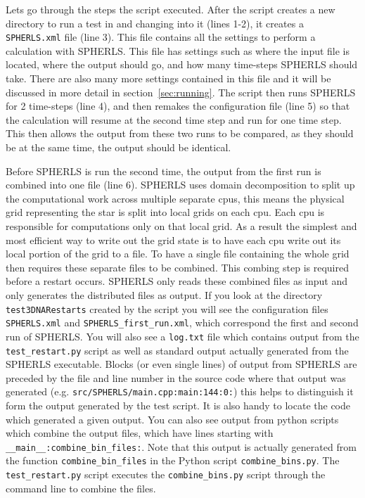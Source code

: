 \documentclass[12pt,a4paper]{book}
\begin{document}
Lets go through the steps the script executed. After the script creates a new directory to run a test in and changing into it (lines 1-2), it creates a {\tt SPHERLS.xml} file (line 3). This file contains all the settings to perform a calculation with SPHERLS. This file has settings such as where the input file is located, where the output should go, and how many time-steps SPHERLS should take. There are also many more settings contained in this file and it will be discussed in more detail in section~\ref{sec:running}. The script then runs SPHERLS for 2 time-steps (line 4), and then remakes the configuration file (line 5) so that the calculation will resume at the second time step and run for one time step. This then allows the output from these two runs to be compared, as they should be at the same time, the output should be identical. 

Before SPHERLS is run the second time, the output from the first run is combined into one file (line 6). SPHERLS uses domain decomposition to split up the computational work across multiple separate cpus, this means the physical grid representing the star is split into local grids on each cpu. Each cpu is responsible for computations only on that local grid. As a result the simplest and most efficient way to write out the grid state is to have each cpu write out its local portion of the grid to a file. To have a single file containing the whole grid then requires these separate files to be combined. This combing step is required before a restart occurs. SPHERLS only reads these combined files as input and only generates the distributed files as output. If you look at the directory {\tt test3DNARestarts} created by the script you will see the configuration files {\tt SPHERLS.xml} and {\tt SPHERLS\_first\_run.xml}, which correspond the first and second run of SPHERLS. You will also see a {\tt log.txt} file which contains output from the {\tt test\_restart.py} script as well as standard output actually generated from the SPHERLS executable. Blocks (or even single lines) of output from SPHERLS are preceded by the file and line number in the source code where that output was generated (e.g. {\tt src/SPHERLS/main.cpp:main:144:0:}) this helps to distinguish it form the output generated by the test script. It is also handy to locate the code which generated a given output. You can also see output from python scripts which combine the output files, which have lines starting with {\tt \_\_main\_\_:combine\_bin\_files:}. Note that this output is actually generated from the function {\tt combine\_bin\_files} in the Python script {\tt combine\_bins.py}. The {\tt test\_restart.py} script executes the {\tt combine\_bins.py} script through the command line to combine the files. 
\end{document}
